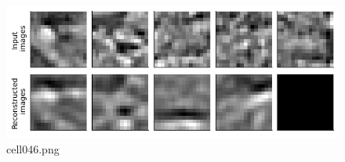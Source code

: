 \begin{figure}[ht]
	\centering
	\includegraphics[scale=0.8, max width=\linewidth]{./fig/energy-based-model/sparse-coding/cell046.png}
	\caption{cell046.png}
	\label{cell046.png}
\end{figure}